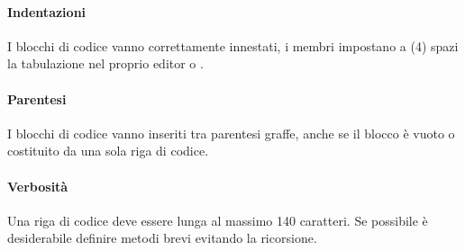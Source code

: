 \paragraph*{Indentazioni}
I blocchi di codice vanno correttamente innestati, i membri impostano a (4) spazi la tabulazione nel proprio editor o .
\paragraph*{Parentesi}
I blocchi di codice vanno inseriti tra parentesi graffe, anche se il blocco è vuoto o costituito da una sola riga di codice.
\paragraph*{Verbosità}
Una riga di codice deve essere lunga al massimo 140 caratteri.
Se possibile è desiderabile definire metodi brevi evitando la ricorsione.


